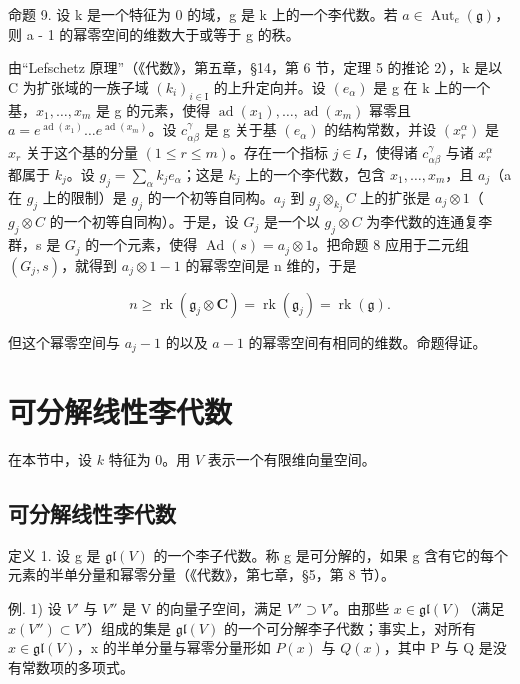 命题 9. 设 k 是一个特征为 0 的域，g 是 k 上的一个李代数。若 \(a \in \operatorname{Aut}_{e}(\mathfrak{g})\)，则 a - 1 的幂零空间的维数大于或等于 g 的秩。

由“Lefschetz 原理”（《代数》，第五章，§14，第 6 节，定理 5 的推论 2），k 是以 C 为扩张域的一族子域 \((k_{i})_{i\in\mathrm{I}}\) 的上升定向并。设 \((e_{\alpha})\) 是 g 在 k 上的一个基，\(x_{1},\ldots,x_{m}\) 是 g 的元素，使得 \(\operatorname{ad}(x_{1}),\ldots,\operatorname{ad}(x_{m})\) 幂零且 \(a=e^{\operatorname{ad}(x_{1})}\ldots e^{\operatorname{ad}(x_{m})}\)。设 \(c_{\alpha\beta}^{\gamma}\) 是 g 关于基 \((e_{\alpha})\) 的结构常数，并设 \((x_{r}^{\alpha})\) 是 \(x_{r}\) 关于这个基的分量 \((1\leq r\leq m)\)。存在一个指标 \(j\in I\)，使得诸 \(c_{\alpha\beta}^{\gamma}\) 与诸 \(x_{r}^{\alpha}\) 都属于 \(k_{j}\)。设 \(g_{j}=\sum_{\alpha}k_{j}e_{\alpha}\)；这是 \(k_{j}\) 上的一个李代数，包含 \(x_{1},\ldots,x_{m}\)，且 \(a_{j}\)（a 在 \(g_{j}\) 上的限制）是 \(g_{j}\) 的一个初等自同构。\(a_{j}\) 到 \(g_{j}\otimes_{k_{j}}C\) 上的扩张是 \(a_{j}\otimes1\)（\(g_{j}\otimes C\) 的一个初等自同构）。于是，设 \(G_{j}\) 是一个以 \(g_{j}\otimes C\) 为李代数的连通复李群，s 是 \(G_{j}\) 的一个元素，使得 \(\operatorname{Ad}(s)=a_{j}\otimes1\)。把命题 8 应用于二元组 \((G_{j},s)\)，就得到 \(a_{j}\otimes1-1\) 的幂零空间是 n 维的，于是

\[
n \geq \operatorname{rk} (\mathfrak {g} _ {j} \otimes \mathbf {C}) = \operatorname{rk} (\mathfrak {g} _ {j}) = \operatorname{rk} (\mathfrak {g}).
\]

但这个幂零空间与 \(a_{j} - 1\) 的以及 \(a - 1\) 的幂零空间有相同的维数。命题得证。

\section{可分解线性李代数}

在本节中，设 \(k\) 特征为 0。用 \(V\) 表示一个有限维向量空间。

\subsection{可分解线性李代数}

定义 1. 设 g 是 \(\mathfrak{gl}(V)\) 的一个李子代数。称 g 是可分解的，如果 g 含有它的每个元素的半单分量和幂零分量（《代数》，第七章，§5，第 8 节）。

例. 1) 设 \(V'\) 与 \(V''\) 是 V 的向量子空间，满足 \(V'' \supset V'\)。由那些 \(x \in \mathfrak{gl}(V)\)（满足 \(x(V'') \subset V'\)）组成的集是 \(\mathfrak{gl}(V)\) 的一个可分解李子代数；事实上，对所有 \(x \in \mathfrak{gl}(V)\)，x 的半单分量与幂零分量形如 \(P(x)\) 与 \(Q(x)\)，其中 P 与 Q 是没有常数项的多项式。

